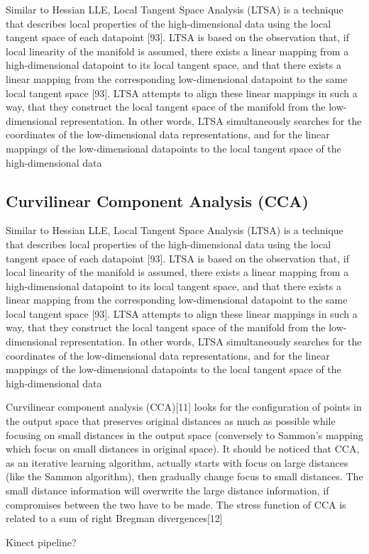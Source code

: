 Similar to Hessian LLE, Local Tangent Space Analysis (LTSA) is a technique that describes local properties of the
high-dimensional data using the local tangent space of each datapoint [93]. LTSA is based on the observation that, if
local linearity of the manifold is assumed, there exists a linear mapping from a high-dimensional datapoint to its local
tangent space, and that there exists a linear mapping from the corresponding low-dimensional datapoint to the same
local tangent space [93]. LTSA attempts to align these linear mappings in such a way, that they construct the local
tangent space of the manifold from the low-dimensional representation. In other words, LTSA simultaneously searches
for the coordinates of the low-dimensional data representations, and for the linear mappings of the low-dimensional
datapoints to the local tangent space of the high-dimensional data





\subsection{Curvilinear Component Analysis (CCA)}

Similar to Hessian LLE, Local Tangent Space Analysis (LTSA) is a technique that describes local properties of the
high-dimensional data using the local tangent space of each datapoint [93]. LTSA is based on the observation that, if
local linearity of the manifold is assumed, there exists a linear mapping from a high-dimensional datapoint to its local
tangent space, and that there exists a linear mapping from the corresponding low-dimensional datapoint to the same
local tangent space [93]. LTSA attempts to align these linear mappings in such a way, that they construct the local
tangent space of the manifold from the low-dimensional representation. In other words, LTSA simultaneously searches
for the coordinates of the low-dimensional data representations, and for the linear mappings of the low-dimensional
datapoints to the local tangent space of the high-dimensional data

Curvilinear component analysis (CCA)[11] looks for the configuration of points in the output space that preserves original distances as much as possible while focusing on small distances in the output space (conversely to Sammon's mapping which focus on small distances in original space).
It should be noticed that CCA, as an iterative learning algorithm, actually starts with focus on large distances (like the Sammon algorithm), then gradually change focus to small distances. The small distance information will overwrite the large distance information, if compromises between the two have to be made.
The stress function of CCA is related to a sum of right Bregman divergences[12]





Kinect pipeline?


